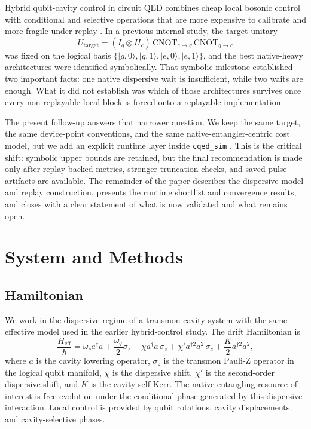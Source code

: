 \documentclass[aps,pra,twocolumn,reprint,amsmath,amssymb]{revtex4-2}
\begin{document}
Hybrid qubit-cavity control in circuit QED combines cheap local bosonic control
with conditional and selective operations that are more expensive to calibrate
and more fragile under replay \cite{koch2007transmon,blais2021circuit}. In a
previous internal study, the target unitary
\begin{equation}
U_{\mathrm{target}} = (I_q \otimes H_c)\,\mathrm{CNOT}_{c \rightarrow q}\,\mathrm{CNOT}_{q \rightarrow c}
\end{equation}
was fixed on the logical basis
$\{\lvert g,0 \rangle, \lvert g,1 \rangle, \lvert e,0 \rangle, \lvert e,1 \rangle\}$, and the
best native-heavy architectures were identified symbolically. That symbolic
milestone established two important facts: one native dispersive wait is
insufficient, while two waits are enough. What it did not establish was which of
those architectures survives once every non-replayable local block is forced
onto a replayable implementation.

The present follow-up answers that narrower question. We keep the same target,
the same device-point conventions, and the same native-entangler-centric cost
model, but we add an explicit runtime layer inside \texttt{cqed\_sim}
\cite{cqed_sim}. This is the critical shift: symbolic upper bounds are retained,
but the final recommendation is made only after replay-backed metrics, stronger
truncation checks, and saved pulse artifacts are available. The remainder of the
paper describes the dispersive model and replay construction, presents the
runtime shortlist and convergence results, and closes with a clear statement of
what is now validated and what remains open.

\section{System and Methods}

\subsection{Hamiltonian}

We work in the dispersive regime of a transmon-cavity system with the same
effective model used in the earlier hybrid-control study. The drift Hamiltonian
is
\begin{equation}
\frac{H_{\mathrm{eff}}}{\hbar} = \omega_c a^{\dagger} a + \frac{\omega_q}{2}\sigma_z
+ \chi a^{\dagger} a\,\sigma_z
+ \chi' a^{\dagger 2} a^2\,\sigma_z
+ \frac{K}{2} a^{\dagger 2} a^2,
\end{equation}
where $a$ is the cavity lowering operator, $\sigma_z$ is the transmon Pauli-Z
operator in the logical qubit manifold, $\chi$ is the dispersive shift,
$\chi'$ is the second-order dispersive shift, and $K$ is the cavity self-Kerr.
The native entangling resource of interest is free evolution under the
conditional phase generated by this dispersive interaction. Local control is
provided by qubit rotations, cavity displacements, and cavity-selective phases.
\end{document}
